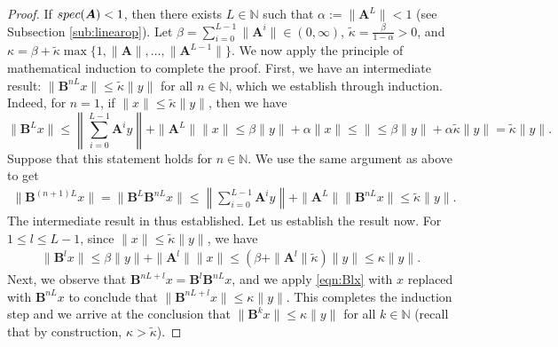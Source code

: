 \documentclass[10pt,a4paper]{amsart}
\newcommand{\Na}{\mathbb{N}}
\newcommand{\op}{\bm}
\newcommand{\spec}{\textttup{spec}}
\newcommand{\textttup}[1]{\textup{\texttt{#1}}}
\begin{document}
\begin{proof}
If $\spec(\op A)<1$, then there exists $L\in\Na$ such that $\alpha:=\|\op A^L\|<1$ (see Subsection \ref{sub:linearop}).
Let $\beta = \sum_{i=0}^{L-1} \|\op A^i\|\in(0,\infty)$, $\tilde \kappa = \frac{\beta}{1-\alpha}>0$, and $\kappa = \beta+\tilde\kappa \max\{1,\|\op A\|,\ldots,\|\op A^{L-1}\|\}$. We now apply the principle of mathematical induction to complete the proof. First, we have an intermediate result: $\|\op B^{nL} x\| \leq \tilde \kappa \|y\|$ for all $n\in\Na$, which we establish through induction. Indeed, for $n=1$, if $ \|x\|\leq \tilde\kappa\|y\|$, then we have 
\[\|\op B^L x\|\leq \left\|\sum_{i=0}^{L-1} \op A^i y\right\| + \|\op A^L\| \|x\| \leq \beta \|y\| + \alpha \|x\|\leq \|\leq\beta \|y\| + \alpha \tilde \kappa \|y\| = \tilde \kappa \|y\|.\]
Suppose that this statement holds for $n\in\Na$. We use the same argument as above to get 
\begin{align*}
    \|\op B^{(n+1)L} x\| = \|\op B^L \op B^{nL}x\|\leq \left\|\sum_{i=0}^{L-1} \op A^i y\right\| + \|\op A^L\| \|\op  B^{nL} x\| \leq \tilde \kappa \|y\|. 
\end{align*}
The intermediate result in thus established. Let us establish the result now. For $1\leq l\leq L-1$, since $ \|x\|\leq \tilde \kappa\|y\|$, we have 
\begin{align}
    \|\op B^l x\| \leq \beta\|y\| + \|\op A^l\| \|x\|\leq (\beta+\|\op A^l\|\tilde\kappa)\|y\|\leq \kappa\|y\|.\label{eqn:Blx}
\end{align}
Next, we observe that $\op B^{nL+l} x = \op B^l \op B^{nL} x$, and we apply \eqref{eqn:Blx} with $x$ replaced with $\op B^{nL} x$ to conclude that $\|\op B^{nL+l} x\|\leq \kappa \|y\|$. This completes the induction step and we arrive at the conclusion that $\|\op B^k x\|\leq \kappa \|y\|$ for all $k\in \Na$ (recall that by construction, $\kappa>\tilde\kappa$). 
\end{proof}
\end{document}
